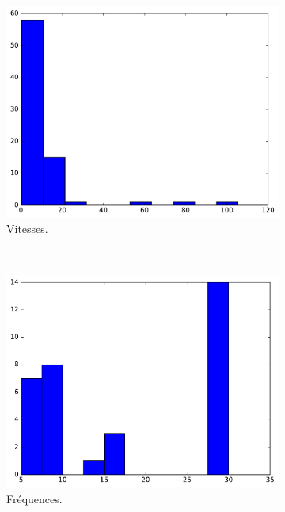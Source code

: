 \begin{appendices}
	\begin{figure}[!htb]
		\begin{subfigure}[t]{\subImgWclicks}
			\centering
			\includegraphics[width=\textwidth]{figures/annexe/bulletA_filteredSpeed}
			\caption{Vitesses.}
			\label{fig:bulletA_filteredSpeed}
		\end{subfigure}
		~
		\begin{subfigure}[t]{\subImgWclicks}
			\centering
			\includegraphics[width=\textwidth]{figures/annexe/bulletA_frequency}
			\caption{Fréquences.}
			\label{fig:bulletA_frequency}
		\end{subfigure}
		~
		\begin{subfigure}[t]{\subImgWclicks}

\end{subfigure}
\end{figure}
\end{appendices}

